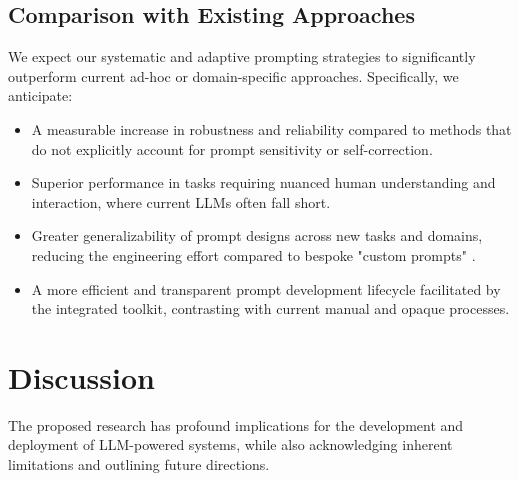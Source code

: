 \documentclass{article}
\newcommand{\citePfive}{\cite{paper5}}
\begin{document}
\subsection{Comparison with Existing Approaches}
We expect our systematic and adaptive prompting strategies to significantly outperform current ad-hoc or domain-specific approaches. Specifically, we anticipate:
\begin{itemize}[noitemsep]
    \item A measurable increase in robustness and reliability compared to methods that do not explicitly account for prompt sensitivity or self-correction.
    \item Superior performance in tasks requiring nuanced human understanding and interaction, where current LLMs often fall short.
    \item Greater generalizability of prompt designs across new tasks and domains, reducing the engineering effort compared to bespoke "custom prompts" \citePfive{}.
    \item A more efficient and transparent prompt development lifecycle facilitated by the integrated toolkit, contrasting with current manual and opaque processes.
\end{itemize}

\section{Discussion}
The proposed research has profound implications for the development and deployment of LLM-powered systems, while also acknowledging inherent limitations and outlining future directions.
\end{document}
